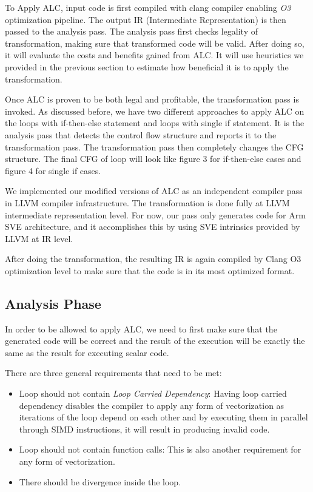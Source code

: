 To Apply ALC, input code is first compiled with clang compiler enabling \emph{O3} optimization pipeline. The output IR (Intermediate Representation) is then passed to the analysis pass. The analysis pass first checks legality of transformation, making sure that transformed code will be valid. After doing so, it will evaluate the costs and benefits gained from ALC. It will use heuristics we provided in the previous section to estimate how beneficial it is to apply the transformation. 

Once ALC is proven to be both legal and profitable, the transformation pass is invoked. As discussed before, we have two different approaches to apply ALC on the loops with if-then-else statement and loops with single if statement. It is the analysis pass that detects the control flow structure and reports it to the transformation pass. The transformation pass then completely changes the CFG structure. The final CFG of loop will look like figure 3 for if-then-else cases and figure 4 for single if cases. 

We implemented our modified versions of ALC as an independent compiler pass in LLVM compiler infrastructure. The transformation is done fully at LLVM intermediate representation level. For now, our pass only generates code for Arm SVE architecture, and it accomplishes this by using SVE intrinsics provided by LLVM at IR level.

After doing the transformation, the resulting IR is again compiled by Clang O3 optimization level to make sure that the code is in its most optimized format.

\subsection{Analysis Phase}
In order to be allowed to apply ALC, we need to first make sure that the generated code will be correct and the result of the execution will be exactly the same as the result for executing scalar code.

There are three general requirements that need to be met:

\begin{itemize}

\item Loop should not contain \emph{Loop Carried Dependency}: Having loop carried dependency disables the compiler to apply any form of vectorization as iterations of the loop depend on each other and by executing them in parallel through SIMD instructions, it will result in producing invalid code.

\item Loop should not contain function calls: This is also another requirement for any form of vectorization.

\item There should be divergence inside the loop.

\end{itemize}

